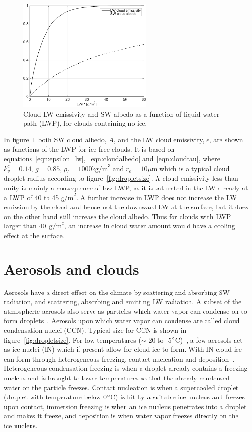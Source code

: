 \begin{figure}
\centering
\includegraphics[width=0.6\textwidth]{theory/eps_alb.pdf}
\caption{Cloud LW emissivity and SW albedo as a function of liquid water path (LWP), for clouds containing no ice.}
\label{fig:epsalb}
\end{figure}

In figure~\ref{fig:epsalb} both SW cloud albedo, $A$, and the LW cloud emissivity, $\epsilon$, are shown as functions of the LWP for ice-free clouds. It is based on equations~\ref{eqn:epsilon_lw},~\ref{eqn:cloudalbedo} and~\ref{eqn:cloudtau}, where $k_v^c=0.14$, $g=0.85$, $\rho_l=1000\text{kg/m}^3$ and $r_e = 10\mu\text{m}$ which is a typical cloud droplet radius according to figure~\ref{fig:dropletsize}. A cloud emissivity less than unity is mainly a consequence of low LWP, as it is saturated in the LW already at a LWP of 40 to 45 $\text{g/m}^2$. A further increase in LWP does not increase the LW emission by the cloud and hence not the downward LW at the surface, but it does on the other hand still increase the cloud albedo. Thus for clouds with LWP larger than 40~$\text{g/m}^2$, an increase in cloud water amount would have a cooling effect at the surface.

\section{Aerosols and clouds}
Aerosols have a direct effect on the climate by scattering and absorbing SW radiation, and scattering, absorbing and emitting LW radiation. A subset of the atmospheric aerosols also serve as particles which water vapor can condense on to form droplets~\citep{Wallace2006}. Aerosols upon which water vapor can condense are called cloud condensation nuclei (CCN). Typical size for CCN is shown in figure~\ref{fig:dropletsize}. For low temperatures ($\sim$-20 to -5$\degree$C)~\citep{Wallace2006}, a few aerosols act as ice nuclei (IN) which if present allow for cloud ice to form. With IN cloud ice can form through heterogeneous freezing, contact nucleation and deposition~\citep{Wallace2006}. Heterogeneous condensation freezing is when a droplet already contains a freezing nucleus and is brought to lower temperatures so that the already condensed water on the particle freezes. Contact nucleation is when a supercooled droplet (droplet with temperature below 0$\degree$C) is hit by a suitable ice nucleus and freezes upon contact, immersion freezing is when an ice nucleus penetrates into a droplet and makes it freeze, and deposition is when water vapor freezes directly on the ice nucleus.

